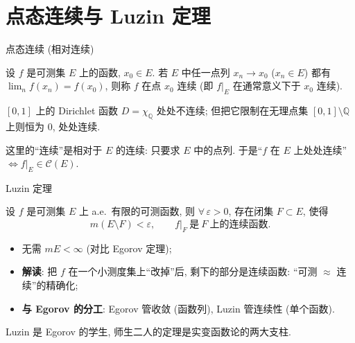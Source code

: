 
\section[Luzin 定理]{点态连续与 Luzin 定理}


\begin{frame}{点态连续 (相对连续)}

\begin{Def}[点态连续]
设 $f$ 是可测集 $E$ 上的函数, $x_0 \in E$. 若 $E$ 中任一点列 $x_n \to x_0$ ($x_n \in E$) 都有
$\lim_n f(x_n) = f(x_0)$, 则称 $f$ 在点 $x_0$ \alert{连续} (即 $f\big|_E$ 在通常意义下于 $x_0$ 连续).
\end{Def}

\pause

\begin{eg}
$[0,1]$ 上的 Dirichlet 函数 $D = \chi_{\mathbb{Q}}$ 处处不连续; 但把它\alert{限制在无理点集}
$[0,1] \setminus \mathbb{Q}$ 上则恒为 $0$, 处处连续.
\end{eg}

\pause

\begin{attnblock}
这里的``连续''是\alert{相对于 $E$} 的连续: 只要求 $E$ 中的点列. 于是``$f$ 在 $E$ 上处处连续''
$\iff f\big|_E \in \mathcal{C}(E)$.
\end{attnblock}

\end{frame}


\begin{frame}{Luzin 定理}

\begin{thm}[Luzin 定理]
设 $f$ 是可测集 $E$ 上 a.e.\ 有限的可测函数, 则 $\forall\, \varepsilon > 0$, 存在\alert{闭集}
$F \subset E$, 使得
\[
m(E \setminus F) < \varepsilon,
\qquad
f\big|_F \ \text{是}\ F\ \text{上的连续函数}.
\]
\end{thm}

\pause

\begin{itemize}
\item \alert{无需} $mE < \infty$ (对比 Egorov 定理);
\item \textbf{解读}: 把 $f$ 在一个小测度集上``改掉''后, 剩下的部分是连续函数: ``可测 $\approx$ 连续''的精确化;
\item \textbf{与 Egorov 的分工}: Egorov 管\alert{收敛} (函数列), Luzin 管\alert{连续性} (单个函数).
\end{itemize}

\pause

\begin{remark}[历史注]
Luzin 是 Egorov 的学生, 师生二人的定理是实变函数论的两大支柱.
\end{remark}

\end{frame}


